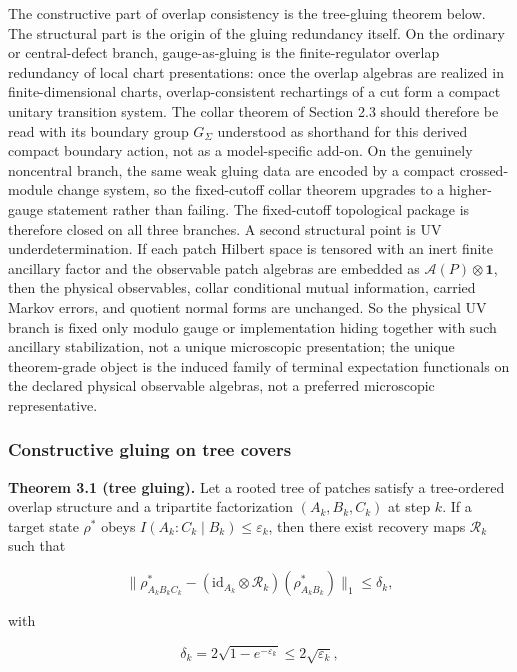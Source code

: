 The constructive part of overlap consistency is the tree-gluing theorem below. The structural part is the origin of the gluing redundancy itself. On the ordinary or central-defect branch, gauge-as-gluing is the finite-regulator overlap redundancy of local chart presentations: once the overlap algebras are realized in finite-dimensional charts, overlap-consistent rechartings of a cut form a compact unitary transition system. The collar theorem of Section 2.3 should therefore be read with its boundary group \(G_\Sigma\) understood as shorthand for this derived compact boundary action, not as a model-specific add-on. On the genuinely noncentral branch, the same weak gluing data are encoded by a compact crossed-module change system, so the fixed-cutoff collar theorem upgrades to a higher-gauge statement rather than failing. The fixed-cutoff topological package is therefore closed on all three branches.
A second structural point is UV underdetermination. If each patch Hilbert space is tensored with an inert finite ancillary factor and the observable patch algebras are embedded as \(\mathcal A(P)\otimes \mathbf 1\), then the physical observables, collar conditional mutual information, carried Markov errors, and quotient normal forms are unchanged. So the physical UV branch is fixed only modulo gauge or implementation hiding together with such ancillary stabilization, not a unique microscopic presentation; the unique theorem-grade object is the induced family of terminal expectation functionals on the declared physical observable algebras, not a preferred microscopic representative.

\subsubsection{Constructive gluing on tree covers}\label{31-constructive-gluing-on-tree-covers}

\textbf{Theorem 3.1 (tree gluing).} Let a rooted tree of patches satisfy a tree-ordered overlap structure and a tripartite factorization \((A_k, B_k, C_k)\) at step \(k\). If a target state \(\rho^{\ast}\) obeys \(I(A_k:C_k \mid B_k) \le \varepsilon_k\), then there exist recovery maps \(\mathcal{R}_k\) such that

\[
\| \rho^{\ast}_{A_k B_k C_k} - (\mathrm{id}_{A_k} \otimes \mathcal{R}_k)(\rho^{\ast}_{A_k B_k}) \|_1
\le \delta_k,
\]

with

\[
\delta_k = 2\sqrt{1-e^{-\varepsilon_k}}
\le 2\sqrt{\varepsilon_k},
\]

